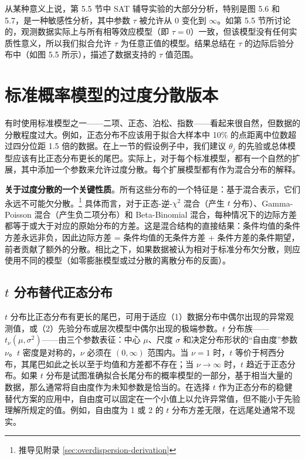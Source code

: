 从某种意义上说，第 5.5 节中 SAT 辅导实验的大部分分析，特别是图 5.6 和 5.7，是一种敏感性分析，其中参数 $\tau$ 被允许从 0 变化到 $\infty$。如第 5.5 节所讨论的，观测数据实际上与所有相等效应模型（即 $\tau = 0$）一致，但该模型没有任何实质性意义，所以我们拟合允许 $\tau$ 为任意正值的模型。结果总结在 $\tau$ 的边际后验分布中（如图 5.5 所示），描述了数据支持的 $\tau$ 值范围。

\section{标准概率模型的过度分散版本}

有时使用标准模型之一——二项、正态、泊松、指数——看起来很自然，但数据的分散程度过大。例如，正态分布不应该用于拟合大样本中 10\% 的点距离中位数超过四分位距 1.5 倍的数据。在上一节的假设例子中，我们建议 $\theta_j$ 的先验或总体模型应该有比正态分布更长的尾巴。实际上，对于每个标准模型，都有一个自然的扩展，其中添加一个参数来允许过度分散。每个扩展模型都有作为混合分布的解释。

\textbf{关于过度分散的一个关键性质}。所有这些分布的一个特征是：基于混合表示，它们永远不可能欠分散。\footnote{推导见附录 \cref{sec:overdispersion-derivation}} 具体而言，对于正态-逆-$\chi^2$ 混合（产生 $t$ 分布）、Gamma-Poisson 混合（产生负二项分布）和 Beta-Binomial 混合，每种情况下的边际方差都等于或大于对应的原始分布的方差。这是混合结构的直接结果：条件均值的条件方差永远非负，因此边际方差 = 条件均值的无条件方差 + 条件方差的条件期望，前者贡献了额外的分散。相比之下，如果数据被认为相对于标准分布欠分散，则应使用不同的模型（如零膨胀模型或过分散的离散分布的反面）。

\subsection{$t$ 分布替代正态分布}

$t$ 分布比正态分布有更长的尾巴，可用于适应（1）数据分布中偶尔出现的异常观测值，或（2）先验分布或层次模型中偶尔出现的极端参数。$t$ 分布族——$t_\nu(\mu, \sigma^2)$——由三个参数表征：中心 $\mu$、尺度 $\sigma$ 和决定分布形状的``自由度''参数 $\nu$。$t$ 密度是对称的，$\nu$ 必须在 $(0, \infty)$ 范围内。当 $\nu = 1$ 时，$t$ 等价于柯西分布，其尾巴如此之长以至于均值和方差都不存在；当 $\nu \to \infty$ 时，$t$ 趋近于正态分布。如果 $t$ 分布是试图准确拟合长尾分布的概率模型的一部分，基于相当大量的数据，那么通常将自由度作为未知参数是恰当的。在选择 $t$ 作为正态分布的稳健替代方案的应用中，自由度可以固定在一个小值上以允许异常值，但不能小于先验理解所规定的值。例如，自由度为 1 或 2 的 $t$ 分布方差无限，在远尾处通常不现实。

